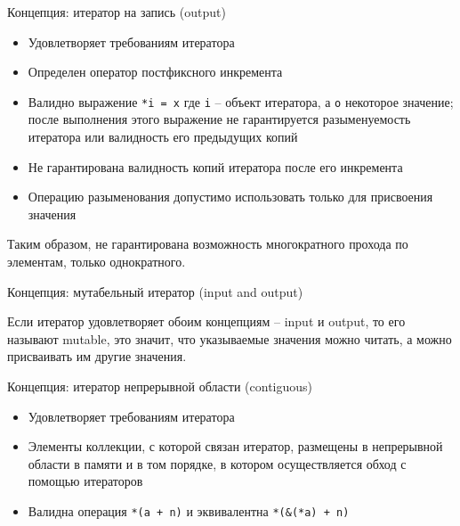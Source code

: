 \documentclass[unknownkeysallowed,xcolor=table]{beamer}
\begin{document}
\begin{frame}[fragile]{Концепция: итератор на запись (output)}

\begin{itemize}
  \item Удовлетворяет требованиям итератора
  \item Определен оператор постфиксного инкремента
  \item Валидно выражение \lstinline{*i = x} где \lstinline{i} -- объект итератора, а \lstinline{o} некоторое значение; после выполнения этого выражение не гарантируется разыменуемость итератора или валидность его предыдущих копий
  \item Не гарантирована валидность копий итератора после его инкремента
  \item Операцию разыменования допустимо использовать только для присвоения значения
\end{itemize}

\vspace{1em}

Таким образом, не гарантирована возможность многократного прохода по элементам, только однократного.

\end{frame}

\begin{frame}[fragile]{Концепция: мутабельный итератор (input and output)}

Если итератор удовлетворяет обоим концепциям -- input и output, то его называют mutable, это значит, что указываемые значения можно читать, а можно присваивать им другие значения.

\end{frame}

\begin{frame}[fragile]{Концепция: итератор непрерывной области (contiguous)}

\begin{itemize}
  \item Удовлетворяет требованиям итератора \vspace{1em}
  \item Элементы коллекции, с которой связан итератор, размещены в непрерывной области в памяти и в том порядке, в котором осуществляется обход с помощью итераторов \vspace{1em}
  \item Валидна операция \lstinline{*(a + n)} и эквивалентна \lstinline{*(&(*a) + n)}
\end{itemize}

\end{frame}
\end{document}
